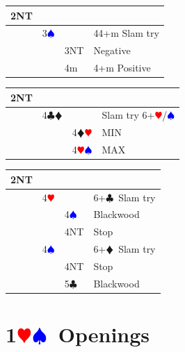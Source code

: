 \documentclass[a4paper]{article}
\newcommand{\BC}{\textcolor{OliveGreen}{$\clubsuit$}}
\newcommand{\BD}{\textcolor{RedOrange}{$\vardiamondsuit$}}
\newcommand{\BH}{\textcolor{Red}{$\varheartsuit${}}}
\newcommand{\BS}{\textcolor{Blue}{$\spadesuit${}}}
\newcommand{\pdfh}{\texorpdfstring{\BH{}}{H}}
\newcommand{\pdfs}{\texorpdfstring{\BS{}}{S}}
\begin{document}
\begingroup
\renewcommand{\arraystretch}{1.4}
\begin{xltabular}{\linewidth}{|l|l|l|X|}
\hline
2NT &  &  &  \\
\hline
 & 3\BS &  & 44+m Slam try \\
\hline
 &  & 3NT & Negative \\
\hline
 &  & 4m & 4+m Positive \\
\hline
\end{xltabular}
\endgroup
\bigbreak
\begingroup
\renewcommand{\arraystretch}{1.4}
\begin{xltabular}{\linewidth}{|l|l|l|X|}
\hline
2NT &  &  &  \\
\hline
 & 4\BC\BD &  & Slam try 6+\BH /\BS \\
\hline
 &  & 4\BD\BH & MIN \\
\hline
 &  & 4\BH\BS & MAX \\
\hline
\end{xltabular}
\endgroup
\bigbreak
\begingroup
\renewcommand{\arraystretch}{1.4}
\begin{xltabular}{\linewidth}{|l|l|l|X|}
\hline
2NT &  &  &  \\
\hline
 & 4\BH &  & 6+\BC\ Slam try \\
\hline
 &  & 4\BS & Blackwood \\
\hline
 &  & 4NT & Stop \\
\hline
 & 4\BS &  & 6+\BD\ Slam try \\
\hline
 &  & 4NT & Stop \\
\hline
 &  & 5\BC & Blackwood \\
\hline
\end{xltabular}
\endgroup
\bigbreak
\section{1\pdfh\pdfs\ Openings}
\end{document}
